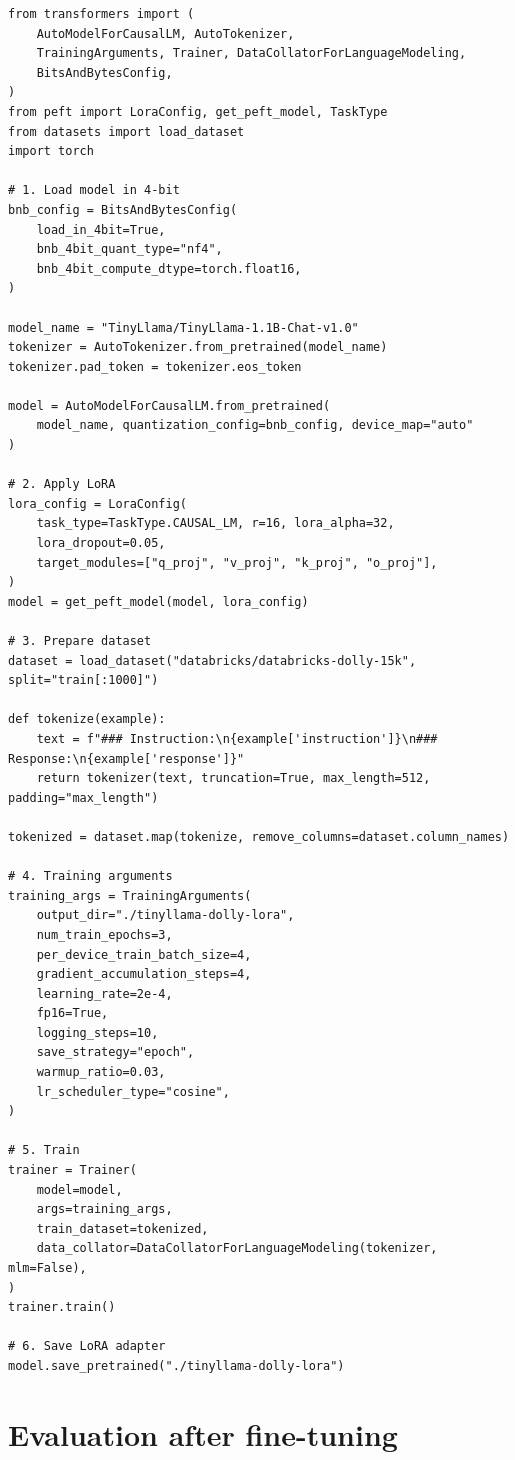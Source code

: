\begin{verbatim}
from transformers import (
    AutoModelForCausalLM, AutoTokenizer,
    TrainingArguments, Trainer, DataCollatorForLanguageModeling,
    BitsAndBytesConfig,
)
from peft import LoraConfig, get_peft_model, TaskType
from datasets import load_dataset
import torch

# 1. Load model in 4-bit
bnb_config = BitsAndBytesConfig(
    load_in_4bit=True,
    bnb_4bit_quant_type="nf4",
    bnb_4bit_compute_dtype=torch.float16,
)

model_name = "TinyLlama/TinyLlama-1.1B-Chat-v1.0"
tokenizer = AutoTokenizer.from_pretrained(model_name)
tokenizer.pad_token = tokenizer.eos_token

model = AutoModelForCausalLM.from_pretrained(
    model_name, quantization_config=bnb_config, device_map="auto"
)

# 2. Apply LoRA
lora_config = LoraConfig(
    task_type=TaskType.CAUSAL_LM, r=16, lora_alpha=32,
    lora_dropout=0.05,
    target_modules=["q_proj", "v_proj", "k_proj", "o_proj"],
)
model = get_peft_model(model, lora_config)

# 3. Prepare dataset
dataset = load_dataset("databricks/databricks-dolly-15k", split="train[:1000]")

def tokenize(example):
    text = f"### Instruction:\n{example['instruction']}\n### Response:\n{example['response']}"
    return tokenizer(text, truncation=True, max_length=512, padding="max_length")

tokenized = dataset.map(tokenize, remove_columns=dataset.column_names)

# 4. Training arguments
training_args = TrainingArguments(
    output_dir="./tinyllama-dolly-lora",
    num_train_epochs=3,
    per_device_train_batch_size=4,
    gradient_accumulation_steps=4,
    learning_rate=2e-4,
    fp16=True,
    logging_steps=10,
    save_strategy="epoch",
    warmup_ratio=0.03,
    lr_scheduler_type="cosine",
)

# 5. Train
trainer = Trainer(
    model=model,
    args=training_args,
    train_dataset=tokenized,
    data_collator=DataCollatorForLanguageModeling(tokenizer, mlm=False),
)
trainer.train()

# 6. Save LoRA adapter
model.save_pretrained("./tinyllama-dolly-lora")
\end{verbatim}

\section{Evaluation after fine-tuning}

